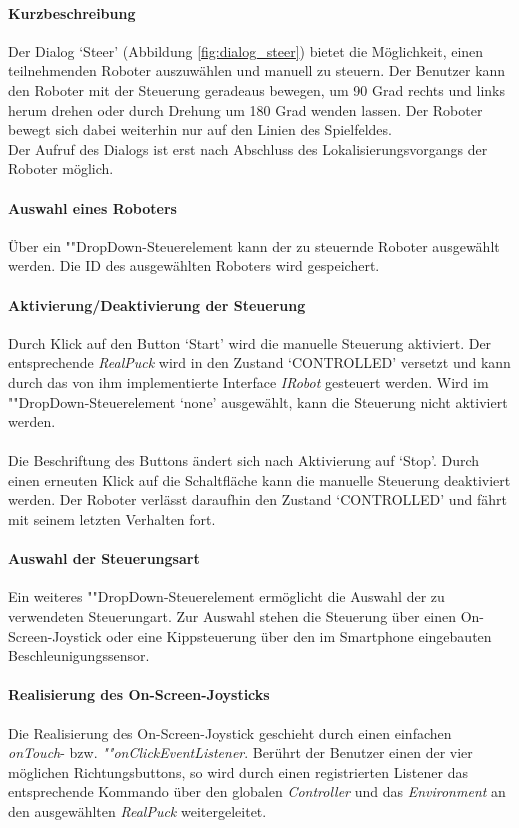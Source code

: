 \documentclass[10pt,a4paper]{article}
\begin{document}
	\paragraph*{Kurzbeschreibung}
	Der Dialog `Steer' (Abbildung \ref{fig:dialog_steer}) bietet die Möglichkeit, einen teilnehmenden Roboter auszuwählen und manuell zu steuern. Der 
	Benutzer kann den Roboter mit der 
	Steuerung geradeaus bewegen, um 90 Grad rechts und links herum drehen oder durch Drehung um 180 Grad wenden lassen. Der Roboter bewegt sich dabei
	weiterhin nur auf den Linien des Spielfeldes. \\
	Der Aufruf des Dialogs ist erst nach Abschluss des Lokalisierungsvorgangs der Roboter möglich.
	
	\paragraph*{Auswahl eines Roboters}
	Über ein ""Drop\-Down-Steu\-er\-ele\-ment kann der zu steuernde Roboter ausgewählt werden. Die ID des ausgewählten Roboters wird gespeichert.
	
	\paragraph*{Aktivierung/Deaktivierung der Steuerung} Durch Klick auf den Button `Start' wird die manuelle Steuerung aktiviert. Der entsprechende
	\textit{RealPuck} wird in den Zustand `CONTROLLED' versetzt und kann durch das von ihm implementierte Interface \textit{IRobot} gesteuert werden.
	Wird im ""Drop\-Down-Steu\-er\-ele\-ment `none' ausgewählt, kann die Steuerung nicht aktiviert werden. \\ \\
	Die Beschriftung des Buttons ändert sich nach Aktivierung auf `Stop'. Durch einen erneuten Klick auf die Schaltfläche kann die manuelle Steuerung
	deaktiviert werden. Der Roboter verlässt daraufhin den Zustand `CONTROLLED' und fährt mit seinem letzten Verhalten fort.
	
	\paragraph*{Auswahl der Steuerungsart} Ein weiteres ""Drop\-Down-Steu\-er\-ele\-ment ermöglicht die Auswahl der zu verwendeten Steuerungart. Zur
	Auswahl stehen die Steuerung über einen On-Screen-Joystick oder eine Kippsteuerung über den im Smartphone eingebauten Beschleunigungssensor.
	
	\paragraph*{Realisierung des On-Screen-Joysticks} Die Realisierung des On-Screen-Joystick geschieht durch einen einfachen \textit{onTouch}- bzw.
	\textit{""on\-Click\-E\-vent\-List\-e\-ner}. Berührt der Benutzer einen der vier möglichen Richtungsbuttons, so wird durch einen registrierten
	Listener das entsprechende Kommando über den globalen \textit{Controller} und das \textit{Environment} an den ausgewählten \textit{RealPuck}
	weitergeleitet.
	
\end{document}
